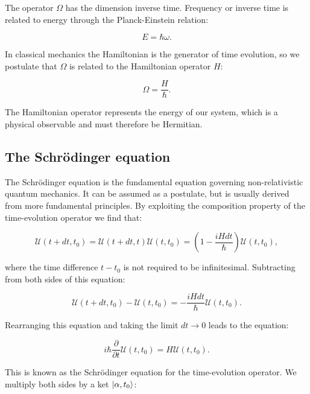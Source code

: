The operator $\Omega$ has the dimension inverse time.
Frequency or inverse time is related to energy
through the Planck-Einstein relation:

\begin{equation}
 E = \hbar \omega .
\end{equation}

In classical mechanics the Hamiltonian is the generator of time evolution,
so we postulate that $\Omega$ is related to the Hamiltonian operator
$H$:

\begin{equation}
 \Omega = \frac{H}{\hbar} .
\end{equation}

The Hamiltonian operator represents the energy of our system,
which is a physical observable and must therefore be Hermitian.

\subsection{The Schr\"{o}dinger equation}
The Schr\"{o}dinger equation is the fundamental equation
governing non-relativistic quantum mechanics. It can be assumed
as a postulate, but is usually derived from more fundamental
principles.
By exploiting the composition property of the time-evolution
operator we find that:

\begin{equation}
 \mathcal{U}(t + dt, t_0) = \mathcal{U}(t + dt, t)
    \mathcal{U}(t, t_0) = (1 - \frac{i H dt}{\hbar})
    \mathcal{U}(t, t_0) ,
\end{equation}

where the time difference $t - t_0$ is not required to be infinitesimal.
Subtracting from both sides of this equation:

\begin{equation}
 \mathcal{U}(t + dt, t_0) - \mathcal{U}(t, t_0) =
    -\frac{iHdt}{\hbar} \mathcal{U}(t, t_0) .
\end{equation}

Rearranging this equation and taking the limit $dt \rightarrow 0$
leads to the equation:

\begin{equation}
 i \hbar \frac{\partial}{\partial t} \mathcal{U}(t, t_0)
    = H \mathcal{U}(t, t_0) .
\end{equation}

This is known as the Schr\"{o}dinger equation for the time-evolution operator.
We multiply both sides by a ket $\ket{\alpha, t_0}$:

